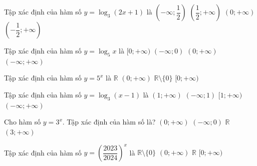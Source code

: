 \begin{ex}%
	 Tập xác định của hàm số $y=\log_3 \left(2x+1\right)$ là
	\choice 
		 {$\left(-\infty;\dfrac{1}{2}\right)$}
		{ $\left(\dfrac{1}{2};+\infty\right)$} 
		{$\left(0;+\infty\right)$} 
		{\True $\left(-\dfrac{1}{2};+\infty\right)$} 
\end{ex}

\begin{ex}%
	Tập  xác định của hàm số $ y={{\log }_5}x$ là
	\choice 
		 { $[0;+\infty)$}
		{ $( -\infty;0)$} 
		 {\True $( 0;+\infty)$}
		{ $( -\infty;+\infty)$} 
\end{ex}

\begin{ex}%
	Tập  xác định của hàm số $y=5^x$ là
	\choice 
		{\True  $\mathbb{R}$}
		 {$(0;+\infty)$}
		 {$\mathbb{R}\setminus \{0\}$}
		{$[0;+\infty)$} 
\end{ex}

\begin{ex}%
	 Tập xác định của hàm số $y=\log_3(x-1)$ là
	 \choice
		 {\True $(1;+\infty)$}
		 {$(-\infty;1)$}
		{$[1;+\infty)$} 
		{$(-\infty;+\infty)$} 
\end{ex}

\begin{ex}%
	Cho hàm số $y=3^x$. Tập xác  định của hàm số là?
	\choice 
		{$(0;+\infty)$} 
		{$(-\infty;0)$} 
		{\True  $\mathbb{R}$}
		{$(3;+\infty)$} 
\end{ex}

\begin{ex}%
	Tập xác định của hàm số  $y=\left(\dfrac{2023}{2024}\right)^x$ là
	\choice 
		{$\mathbb{R}\setminus\{0\}$} 
		{$(0;+\infty)$} 
		{\True  $\mathbb{R}$}
		 {$[0;+\infty)$}
\end{ex}

